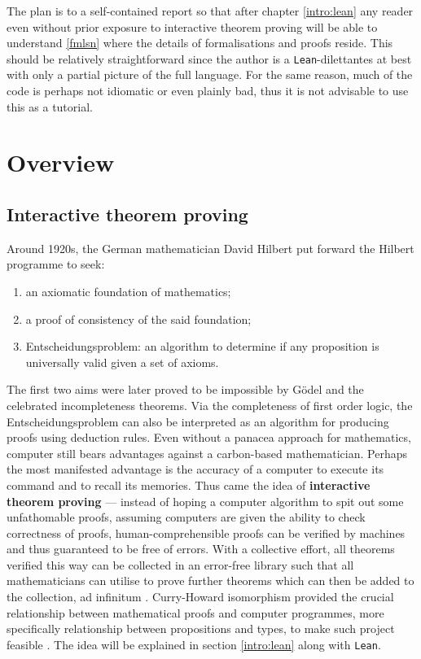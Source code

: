 \documentclass{report}
\theoremstyle{definition}
\theoremstyle{plain}
\begin{document}
The plan is to a self-contained report so that after chapter \ref{intro:lean} any reader even without prior exposure to interactive theorem proving will be able to understand \ref{fmlsn} where the details of formalisations and proofs reside. This should be relatively straightforward since the author is a {\tt Lean}-dilettantes at best with only a partial picture of the full language. For the same reason, much of the code is perhaps not idiomatic or even plainly bad, thus it is not advisable to use this as a tutorial.

\tableofcontents

\chapter{Overview}
\section{Interactive theorem proving}
Around 1920s, the German mathematician David Hilbert put forward the Hilbert programme to seek:
\begin{enumerate}
  \item an axiomatic foundation of mathematics;
  \item a proof of consistency of the said foundation;
  \item Entscheidungsproblem: an algorithm to determine if any proposition is universally valid given a set of axioms.
\end{enumerate}
The first two aims were later proved to be impossible by G\"odel and the celebrated incompleteness theorems. Via the completeness of first order logic, the Entscheidungsproblem can also be interpreted as an algorithm for producing proofs using deduction rules. Even without a panacea approach for mathematics, computer still bears advantages against a carbon-based mathematician. Perhaps the most manifested advantage is the accuracy of a computer to execute its command and to recall its memories. Thus came the idea of {\bf interactive theorem proving} --- instead of hoping a computer algorithm to spit out some unfathomable proofs, assuming computers are given the ability to check correctness of proofs, human-comprehensible proofs can be verified by machines and thus guaranteed to be free of errors. With a collective effort, all theorems verified this way can be collected in an error-free library such that all mathematicians can utilise to prove further theorems which can then be added to the collection, ad infinitum \cite{boyer1994qed}. Curry-Howard isomorphism provided the crucial relationship between mathematical proofs and computer programmes, more specifically relationship between propositions and types, to make such project feasible \cite{kennedy2011set}. The idea will be explained in section \ref{intro:lean} along with {\tt Lean}. 
\end{document}
